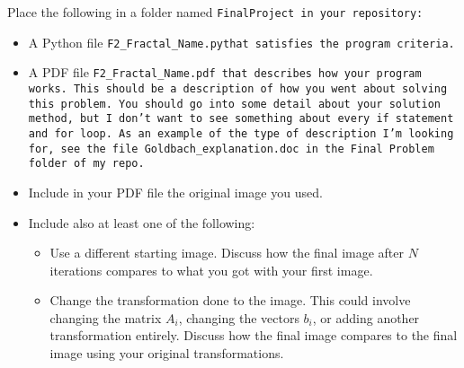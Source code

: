 \documentclass{article}
\newcommand\foldername{\tt{FinalProject} }
\newcommand\filename{\tt{F2\_Fractal\_Name.py}\;\;}
\begin{document}
	
	Place the following in a folder named \foldername in your repository:
	\begin{itemize}
		\item A Python file \filename  that satisfies the program criteria.
		\item A PDF file \tt{F2\_Fractal\_Name.pdf} that describes how your program works.  This should be a description of how you went about solving this problem.  You should go into some detail about your solution method, but I don't want to see something about every \tt{if} statement and \tt{for} loop.  As an example of the type of description I'm looking for, see the file \tt{Goldbach\_explanation.doc} in the \tt{Final Problem} folder of my repo.
		\item Include in your PDF file the original image you used.  
		\item Include also at least one of the following:
		\begin{itemize}
			\item Use a different starting image.  Discuss how the final image after $N$ iterations compares to what you got with your first image.
			\item Change the transformation done to the image.  This could involve changing the matrix $A_i$, changing the vectors $b_i$, or adding another transformation entirely.  Discuss how the final image compares to the final image using your original transformations.
		\end{itemize}
	\end{itemize}

	
\end{document}
